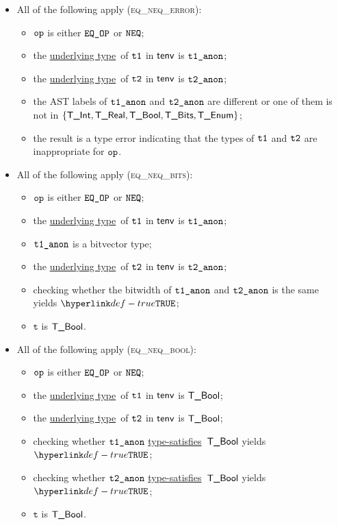\documentclass{book}
\newcommand\ProseOrTypeError[0]{\ProseTerminateAs{\TypeErrorConfig}}
\newcommand\underlyingtype[0]{\hyperlink{def-underlyingtype}{underlying type}}
\newcommand\typesatisfies[0]{\hyperlink{def-typesatisfies}{type-satisfies}}
\newcommand\vt[0]{\texttt{t}}
\begin{document}
\begin{itemize}
  \item All of the following apply (\textsc{eq\_neq\_error}):
  \begin{itemize}
    \item $\texttt{op}$ is either $\texttt{EQ\_OP}$ or $\texttt{NEQ}$;
    \item the \underlyingtype\ of $\texttt{t1}$ in $\textsf{tenv}$ is $\texttt{t1\_anon}$\ProseOrTypeError;
    \item the \underlyingtype\ of $\texttt{t2}$ in $\textsf{tenv}$ is $\texttt{t2\_anon}$\ProseOrTypeError;
    \item the AST labels of $\texttt{t1\_anon}$ and $\texttt{t2\_anon}$ are different or one of them is not in
          $\{\textsf{T\_Int}, \textsf{T\_Real}, \textsf{T\_Bool}, \textsf{T\_Bits}, \textsf{T\_Enum}\}$;
    \item the result is a type error indicating that the types of $\texttt{t1}$ and $\texttt{t2}$ are inappropriate for $\texttt{op}$.
  \end{itemize}

  \item All of the following apply (\textsc{eq\_neq\_bits}):
  \begin{itemize}
    \item $\texttt{op}$ is either $\texttt{EQ\_OP}$ or $\texttt{NEQ}$;
    \item the \underlyingtype\ of $\texttt{t1}$ in $\textsf{tenv}$ is $\texttt{t1\_anon}$\ProseOrTypeError;
    \item $\texttt{t1\_anon}$ is a bitvector type;
    \item the \underlyingtype\ of $\texttt{t2}$ in $\textsf{tenv}$ is $\texttt{t2\_anon}$\ProseOrTypeError;
    \item checking whether the bitwidth of $\texttt{t1\_anon}$ and $\texttt{t2\_anon}$ is the same yields $\True$\ProseOrTypeError;
    \item $\vt$ is $\textsf{T\_Bool}$.
  \end{itemize}

  \item All of the following apply (\textsc{eq\_neq\_bool}):
  \begin{itemize}
    \item $\texttt{op}$ is either $\texttt{EQ\_OP}$ or $\texttt{NEQ}$;
    \item the \underlyingtype\ of $\texttt{t1}$ in $\textsf{tenv}$ is $\textsf{T\_Bool}$\ProseOrTypeError;
    \item the \underlyingtype\ of $\texttt{t2}$ in $\textsf{tenv}$ is $\textsf{T\_Bool}$\ProseOrTypeError;
    \item checking whether $\texttt{t1\_anon}$ \typesatisfies\ $\textsf{T\_Bool}$ yields $\True$\ProseOrTypeError;
    \item checking whether $\texttt{t2\_anon}$ \typesatisfies\ $\textsf{T\_Bool}$ yields $\True$\ProseOrTypeError;
    \item $\vt$ is $\textsf{T\_Bool}$.
  \end{itemize}


\end{itemize}
\end{document}
